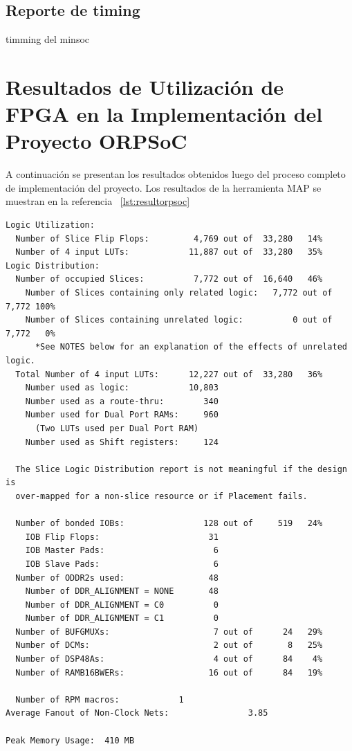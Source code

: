 \subsection{Reporte de timing}	

timming del minsoc

		
\newpage
	\section{Resultados de Utilización de FPGA en la Implementación del Proyecto ORPSoC}
	
	A continuación se presentan los resultados obtenidos luego del proceso completo de implementación del proyecto.  Los resultados de la herramienta MAP
	se muestran en la referencia ~\ref{lst:resultorpsoc}
		
\begin{lstlisting}[frame=single,caption={Resumen de utilización - ORPSoC},label={lst:resultorpsoc},breaklines]
Logic Utilization:
  Number of Slice Flip Flops:         4,769 out of  33,280   14%
  Number of 4 input LUTs:            11,887 out of  33,280   35%
Logic Distribution:
  Number of occupied Slices:          7,772 out of  16,640   46%
    Number of Slices containing only related logic:   7,772 out of   7,772 100%
    Number of Slices containing unrelated logic:          0 out of   7,772   0%
      *See NOTES below for an explanation of the effects of unrelated logic.
  Total Number of 4 input LUTs:      12,227 out of  33,280   36%
    Number used as logic:            10,803
    Number used as a route-thru:        340
    Number used for Dual Port RAMs:     960
      (Two LUTs used per Dual Port RAM)
    Number used as Shift registers:     124

  The Slice Logic Distribution report is not meaningful if the design is
  over-mapped for a non-slice resource or if Placement fails.

  Number of bonded IOBs:                128 out of     519   24%
    IOB Flip Flops:                      31
    IOB Master Pads:                      6
    IOB Slave Pads:                       6
  Number of ODDR2s used:                 48
    Number of DDR_ALIGNMENT = NONE       48
    Number of DDR_ALIGNMENT = C0          0
    Number of DDR_ALIGNMENT = C1          0
  Number of BUFGMUXs:                     7 out of      24   29%
  Number of DCMs:                         2 out of       8   25%
  Number of DSP48As:                      4 out of      84    4%
  Number of RAMB16BWERs:                 16 out of      84   19%

  Number of RPM macros:            1
Average Fanout of Non-Clock Nets:                3.85

Peak Memory Usage:  410 MB

\end{lstlisting}	
		
